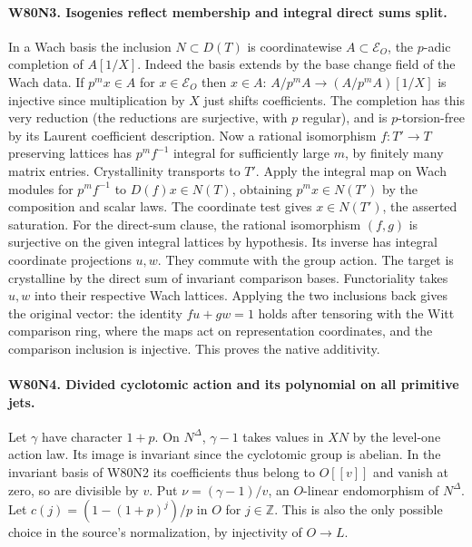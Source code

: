 \paragraph{W80N3. Isogenies reflect membership and integral direct sums split.}
In a Wach basis the inclusion $N\subset D(T)$ is coordinatewise
$A\subset\mathcal E_O$, the $p$-adic completion of $A[1/X]$.
Indeed the basis extends by the base change field of the Wach data.
If $p^m x\in A$ for $x\in\mathcal E_O$ then $x\in A$:
$A/p^m A\longrightarrow(A/p^m A)[1/X]$ is injective since
multiplication by $X$ just shifts coefficients. The completion has
this very reduction (the reductions are surjective, with $p$ regular),
and is $p$-torsion-free by its Laurent coefficient description.
Now a rational isomorphism $f:T'\to T$ preserving lattices has
$p^m f^{-1}$ integral for sufficiently large $m$, by finitely many
matrix entries. Crystallinity transports to $T'$. Apply the integral
map on Wach modules for $p^mf^{-1}$ to $D(f)x\in N(T)$, obtaining
$p^mx\in N(T')$ by the composition and scalar laws. The coordinate
test gives $x\in N(T')$, the asserted saturation. For the direct-sum
clause, the rational isomorphism $(f,g)$ is surjective on the given
integral lattices by hypothesis. Its inverse has integral coordinate
projections $u,w$. They commute with the group action. The target is
crystalline by the direct sum of invariant comparison bases.
Functoriality takes $u,w$ into their respective Wach lattices.
Applying the two inclusions back gives the original vector: the
identity $fu+gw=1$ holds after tensoring with the Witt comparison
ring, where the maps act on representation coordinates, and the
comparison inclusion is injective. This proves the native additivity.

\paragraph{W80N4. Divided cyclotomic action and its polynomial on all primitive jets.}
Let $\gamma$ have character $1+p$. On $N^\Delta$, $\gamma-1$ takes
values in $XN$ by the level-one action law. Its image is invariant
since the cyclotomic group is abelian. In the invariant basis of
W80N2 its coefficients thus belong to $O[[v]]$ and vanish at zero,
so are divisible by $v$. Put $\nu=(\gamma-1)/v$, an $O$-linear
endomorphism of $N^\Delta$. Let $c(j)=(1-(1+p)^j)/p$ in $O$ for
$j\in\mathbb Z$. This is also the only possible choice in the source's
normalization, by injectivity of $O\to L$.

